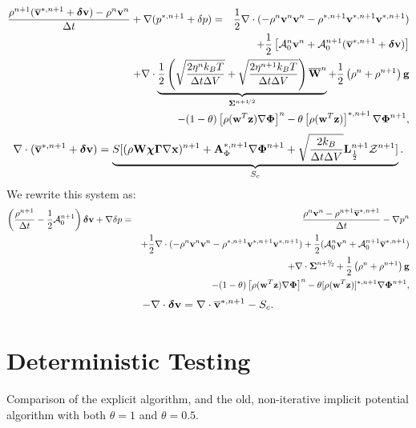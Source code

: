\documentclass[final]{siamltex}
\newcommand{\sfrac}[2]{\mathchoice
  {\kern0em\raise.5ex\hbox{\the\scriptfont0 #1}\kern-.15em/
   \kern-.15em\lower.25ex\hbox{\the\scriptfont0 #2}}
  {\kern0em\raise.5ex\hbox{\the\scriptfont0 #1}\kern-.15em/
   \kern-.15em\lower.25ex\hbox{\the\scriptfont0 #2}}
  {\kern0em\raise.5ex\hbox{\the\scriptscriptfont0 #1}\kern-.2em/
   \kern-.15em\lower.25ex\hbox{\the\scriptscriptfont0 #2}}
  {#1\!/#2}}
\def\Ab {{\bf A}}
\def\gb {{\bf g}}
\def\Lb {{\bf L}}
\def\vb {{\bf v}}
\def\wb {{\bf w}}
\def\Wb {{\bf W}}
\def\xb {{\bf x}}
\def\zb {{\bf z}}
\def\chib   {\boldsymbol{\chi}}
\def\deltab {\boldsymbol{\delta}}
\def\Gammab {\boldsymbol{\Gamma}}
\def\Phib   {\boldsymbol{\Phi}}
\def\Sigmab {\boldsymbol{\Sigma}}
\def\half   {\frac{1}{2}}
\def\myhalf {\sfrac{1}{2}}
\begin{document}
{\begin{eqnarray}
\frac{\rho^{n+1}(\overline\vb^{*,n+1} + \deltab\vb) - \rho^n\vb^n}{\Delta t} + \nabla(p^{*,n+1}+\delta p) &=& \half\nabla\cdot(-\rho^n\vb^n\vb^n - \rho^{*,n+1}\vb^{*,n+1}\vb^{*,n+1})\nonumber\\
&&\hspace{-1.5in}+ \half\left[\mathcal{A}_0^n\vb^n + \mathcal{A}_0^{n+1}(\overline\vb^{*,n+1} + \deltab\vb)\right]\nonumber\\
&&\hspace{-1.5in}+ \nabla\cdot\underbrace{\half\left(\sqrt{\frac{2\eta^n k_B T}{\Delta t\Delta V}} + \sqrt{\frac{2\eta^{n+1} k_B T}{\Delta t\Delta V}}\right)\overline\Wb^n}_{\Sigmab^{n+\myhalf}} + \half\left(\rho^n+\rho^{n+1}\right)\gb\nonumber\\
&&\hspace{-1.5in} - (1-\theta)\left[\rho(\wb^T\zb)\nabla\Phib\right]^n - \theta\left[\rho(\wb^T\zb)\right]^{*,n+1}\nabla\Phib^{n+1},
\end{eqnarray}
\begin{equation}
\nabla\cdot(\overline\vb^{*,n+1} + \deltab\vb) =  \underbrace{S[(\rho\Wb\chib\Gammab\nabla\xb)^{n+1} + \Ab_\Phi^{*,n+1}\nabla\Phib^{n+1} + \sqrt{\frac{2k_B}{\Delta t\Delta V}}\Lb_\half^{n+1}\mathcal{Z}^{n+1}]}_{S_c}.
\end{equation}
We rewrite this system as:
\begin{eqnarray}
\left(\frac{\rho^{n+1}}{\Delta t} - \half\mathcal{A}_0^{n+1}\right)\deltab\vb + \nabla\delta p &=& \frac{\rho^n\vb^n-\rho^{n+1}\overline\vb^{*,n+1}}{\Delta t} -\nabla p^n\nonumber\\
&&+ \half\nabla\cdot(-\rho^n\vb^n\vb^n - \rho^{*,n+1}\vb^{*,n+1}\vb^{*,n+1}) + \half(\mathcal{A}_0^n\vb^n + \mathcal{A}_0^{n+1}\overline\vb^{*,n+1} )\nonumber\\
&&+ \nabla\cdot\Sigmab^{n+\myhalf} + \half\left(\rho^n+\rho^{n+1}\right)\gb\nonumber\\
&&- (1-\theta)\left[\rho(\wb^T\zb)\nabla\Phib\right]^n - \theta[\rho(\wb^T\zb)]^{*,n+1}\nabla\Phib^{n+1},
\end{eqnarray}
\begin{equation}
-\nabla\cdot\deltab\vb = \nabla\cdot\overline\vb^{*,n+1} - S_c.
\end{equation}
} %

\section{Deterministic Testing}
Comparison of the explicit algorithm, and the old, non-iterative implicit
potential algorithm with both $\theta=1$ and $\theta=0.5$.
\end{document}
